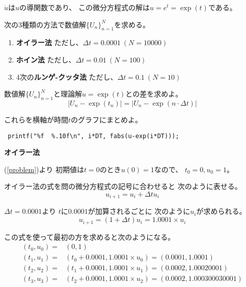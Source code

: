 \documentclass[12pt,b5paper]{ltjsarticle}
\begin{document}
$\dot{u}$は$u$の導関数であり、
この微分方程式の解は$u = e^t = \exp(t)$である。


次の3種類の方法で数値解$\{U_n\}_{n=1}^{N}$を求める。
\begin{enumerate}
 \item
      \textbf{オイラー法}
      \quad
      ただし、$\Delta t = 0.0001 \ (N=10000)$

 \item
      \textbf{ホイン法}
      \quad
      ただし、$\Delta t = 0.01 \ (N=100)$

 \item
      4次の\textbf{ルンゲ-クッタ法}
      \quad
      ただし、$\Delta t = 0.1 \ (N=10)$
\end{enumerate}

数値解$\{U_n\}_{n=1}^{N}$と理論解$u=\exp(t)$との差を求めよ。
\begin{equation}
 \lvert U_n -\exp(t_n)\rvert = \lvert U_n -\exp(n\cdot \Delta t)\rvert
\end{equation}

これらを横軸が時間$t$のグラフにまとめよ。

\begin{lstlisting}
 printf("%f  %.10f\n", i*DT, fabs(u-exp(i*DT)));
\end{lstlisting}




\dotfill
\textbf{オイラー法}
\dotfill

(\ref{problem})より
初期値は$t=0$のとき$u(0)=1$なので、
$t_0=0,u_0=1$。

オイラー法の式を問の微分方程式の記号に合わせると
次のように表せる。
\begin{equation}
 u_{i+1} = u_{i} + \Delta t u_{i}
\end{equation}

$\Delta t=0.0001$より
$t$に$0.0001$が加算されるごとに
次のように$u_{i}$が求められる。
\begin{equation}
 u_{i+1} = (1+\Delta t)u_{i} = 1.0001 \times u_{i}
  \label{euler}
\end{equation}

この式を使って最初の方を求めると次のようになる。
\begin{align}
 (t_0,u_0)=&(0,1)\\
 (t_1,u_1)=&(t_0+0.0001,1.0001\times u_0)=(0.0001,1.0001)\\
 (t_2,u_2)=&(t_1+0.0001,1.0001\times u_1)=(0.0002,1.00020001)\\
 (t_3,u_3)=&(t_2+0.0001,1.0001\times u_2)=(0.0002,1.000300030001)
\end{align}
\end{document}
